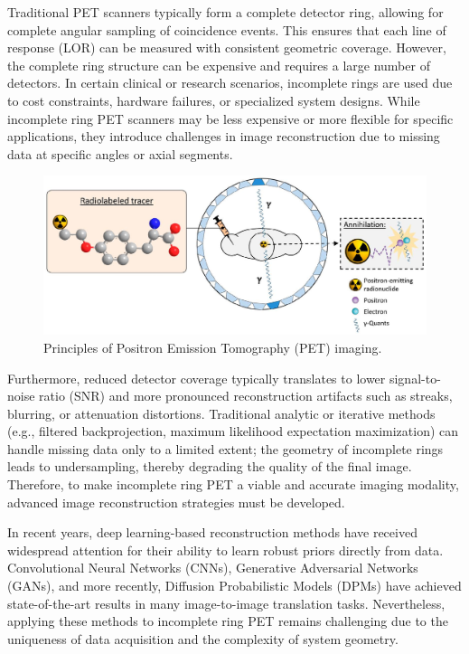 \documentclass[
reprint,
superscriptaddress,
nofootinbib,
amsmath,amssymb,
aps,
prd,
]{revtex4-2}
\begin{document}
Traditional PET scanners typically form a complete detector ring, allowing for complete angular sampling of coincidence events. This ensures that each line of response (LOR) can be measured with consistent geometric coverage. However, the complete ring structure can be expensive and requires a large number of detectors. In certain clinical or research scenarios, incomplete rings are used due to cost constraints, hardware failures, or specialized system designs. While incomplete ring PET scanners may be less expensive or more flexible for specific applications, they introduce challenges in image reconstruction due to missing data at specific angles or axial segments.
\begin{figure}[htbp]
	\centering
	\includegraphics[scale=0.47]{./Images/graph.jpg}
	\caption{Principles of Positron Emission Tomography (PET) imaging.}
	\label{fig:graph}
\end{figure}
Furthermore, reduced detector coverage typically translates to lower signal-to-noise ratio (SNR) and more pronounced reconstruction artifacts such as streaks, blurring, or attenuation distortions. Traditional analytic or iterative methods (e.g., filtered backprojection, maximum likelihood expectation maximization) can handle missing data only to a limited extent; the geometry of incomplete rings leads to undersampling, thereby degrading the quality of the final image. Therefore, to make incomplete ring PET a viable and accurate imaging modality, advanced image reconstruction strategies must be developed.

In recent years, deep learning-based reconstruction methods have received widespread attention for their ability to learn robust priors directly from data. Convolutional Neural Networks (CNNs), Generative Adversarial Networks (GANs), and more recently, Diffusion Probabilistic Models (DPMs) have achieved state-of-the-art results in many image-to-image translation tasks. Nevertheless, applying these methods to incomplete ring PET remains challenging due to the uniqueness of data acquisition and the complexity of system geometry.
\end{document}
